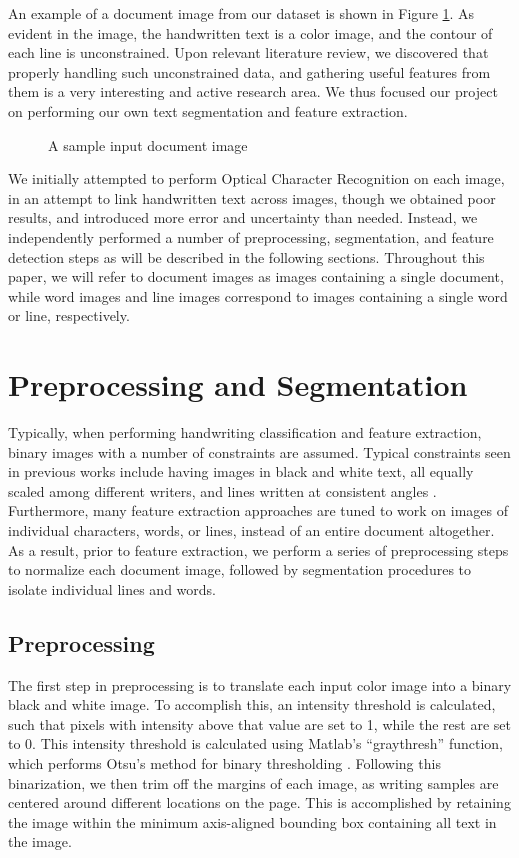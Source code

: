 \documentclass[paper=a4, fontsize=11pt]{scrartcl} %
\numberwithin{equation}{section} %
\numberwithin{figure}{section} %
\numberwithin{table}{section} %
\begin{document}
An example of a document image from our dataset is shown in Figure
\ref{fig:docImage}. As evident in the image, the handwritten text is a
color image, and the contour of each line is unconstrained. Upon
relevant literature review, we discovered that properly handling such
unconstrained data, and gathering useful features from them is a very
interesting and active research area. We thus focused our project on
performing our own text segmentation and feature extraction.


\begin{figure}
  \centering {}
  \caption{A sample input document image}
  \label{fig:docImage}
\end{figure}

We initially attempted to perform Optical Character Recognition on
each image, in an attempt to link handwritten text across images,
though we obtained poor results, and introduced more error and
uncertainty than needed. Instead, we independently performed a number
of preprocessing, segmentation, and feature detection steps as will be
described in the following sections. Throughout this paper, we will
refer to document images as images containing a single document, while
word images and line images correspond to images containing a single
word or line, respectively.

\section{Preprocessing and Segmentation}
\label{sec:pands}
Typically, when performing handwriting classification and feature
extraction, binary images with a number of constraints are
assumed. Typical constraints seen in previous works include having
images in black and white text, all equally scaled among different
writers, and lines written at consistent angles
\cite{Preprocessing}. Furthermore, many feature extraction approaches
are tuned to work on images of individual characters, words, or lines,
instead of an entire document altogether. As a result, prior to
feature extraction, we perform a series of preprocessing steps to
normalize each document image, followed by segmentation procedures to
isolate individual lines and words.

\subsection{Preprocessing}
The first step in preprocessing is to translate each input color image
into a binary black and white image. To accomplish this, an intensity
threshold is calculated, such that pixels with intensity above that
value are set to 1, while the rest are set to 0. This intensity
threshold is calculated using Matlab's ``graythresh'' function, which
performs Otsu's method for binary thresholding
\cite{ThresholdSelection}. Following this binarization, we then trim
off the margins of each image, as writing samples are centered around
different locations on the page. This is accomplished by retaining the
image within the minimum axis-aligned bounding box containing all text
in the image.
\end{document}
